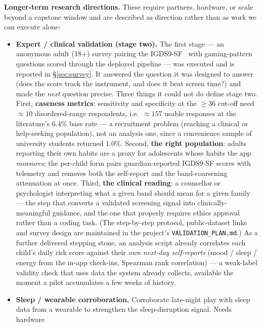 \documentclass[11pt,a4paper]{article}
\begin{document}
\textbf{Longer-term research directions.}
These require partners, hardware, or scale beyond a capstone window and are described as
direction rather than as work we can execute alone:
\begin{itemize}[leftmargin=1.4em]
  \item \textbf{Expert / clinical validation (stage two).} The first stage ---
        an anonymous adult (18+) survey pairing the IGDS9-SF~\cite{igds9sf} with
        gaming-pattern questions scored through the deployed pipeline --- was
        executed and is reported in \S\ref{sec:survey}. It answered the question
        it was designed to answer (does the score track the instrument, and does
        it beat screen time?) and made the \emph{next} question precise. Three
        things it could not do define stage two. First, \textbf{caseness
        metrics}: sensitivity and specificity at the $\geq$$36$ cut-off need
        $\approx$$10$ disordered-range respondents, i.e.\ $\approx$$157$ usable
        responses at the literature's $6.4\%$ base rate --- a recruitment
        problem (reaching a clinical or help-seeking population), not an
        analysis one, since a convenience sample of university students returned
        $1.0\%$. Second, \textbf{the right population}: adults reporting their
        own habits are a proxy for adolescents whose habits the app
        \emph{measures}; the per-child form pairs guardian-reported IGDS9-SF
        scores with telemetry and removes both the self-report and the
        band-coarsening attenuation at once. Third, \textbf{the clinical
        reading}: a counsellor or psychologist interpreting what a given band
        should mean for a given family --- the step that converts a validated
        screening signal into clinically-meaningful guidance, and the one that
        properly requires ethics approval rather than a coding task. (The
        step-by-step protocol, public-dataset links and survey design are
        maintained in the project's \texttt{VALIDATION\_PLAN.md}.)
        As a further delivered stepping stone, an analysis script already correlates each
        child's daily risk score against their \emph{own next-day self-reports}
        (mood / sleep / energy from the in-app check-ins, Spearman rank correlation)
        --- a weak-label validity check that uses data the system already collects,
        available the moment a pilot accumulates a few weeks of history.
  \item \textbf{Sleep / wearable corroboration.} Corroborate late-night play with sleep
        data from a wearable to strengthen the sleep-disruption signal. Needs hardware
$$
\end{itemize}
\end{document}
